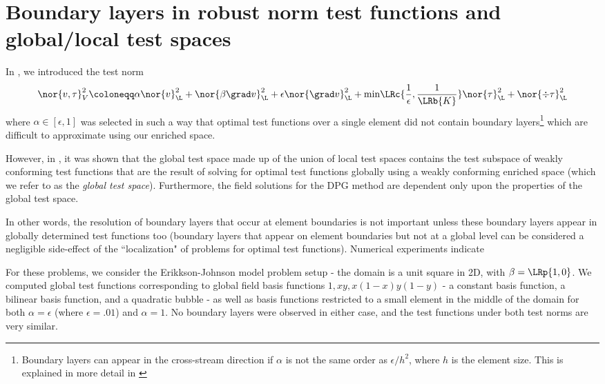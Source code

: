 
\section{Boundary layers in robust norm test functions and global/local test spaces}

In \cite{DPGrobustness, ChanHeuerBui-ThanhDemkowicz12}, we introduced the test norm
\[
\nor{v,\tau}_V^2 \coloneqq \alpha\nor{v}_{\L}^2 + \nor{\beta\grad v}_{\L}^2 + \epsilon \nor{\grad v}_{\L}^2 + {\min}\LRc{\frac{1}{\epsilon},\frac{1}{\LRb{K}}}\nor{\tau}_{\L}^2 + \nor{\div \tau}_{\L}^2
\]
where $\alpha \in [\epsilon,1]$ was selected in such a way that optimal test functions over a single element did not contain boundary layers\footnote{Boundary layers can appear in the cross-stream direction if $\alpha$ is not the same order as $\epsilon/h^2$, where $h$ is the element size.  This is explained in more detail in \cite{ChanHeuerBui-ThanhDemkowicz12}} which are difficult to approximate using our enriched space.  

However, in \cite{globalLocalDPG}, it was shown that the global test space made up of the union of local test spaces contains the test subspace of weakly conforming test functions that are the result of solving for optimal test functions globally using a weakly conforming enriched space (which we refer to as the \textit{global test space}).  Furthermore, the field solutions for the DPG method are dependent only upon the properties of the global test space.  

In other words, the resolution of boundary layers that occur at element boundaries is not important unless these boundary layers appear in globally determined test functions too (boundary layers that appear on element boundaries but not at a global level can be considered a negligible side-effect of the ``localization" of problems for optimal test functions).  Numerical experiments indicate

For these problems, we consider the Erikkson-Johnson model problem setup - the domain is a unit square in 2D, with $\beta = \LRp{1,0}$.  We computed global test functions corresponding to global field basis functions $1, xy, x(1-x)y(1-y)$ - a constant basis function, a bilinear basis function, and a quadratic bubble - as well as basis functions restricted to a small element in the middle of the domain for both $\alpha = \epsilon$ (where $\epsilon = .01$) and $\alpha = 1$.  No boundary layers were observed in either case, and the test functions under both test norms are very similar. 

